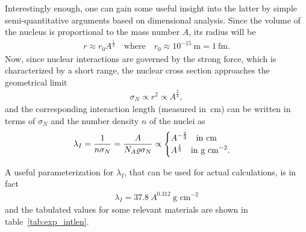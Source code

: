 Interestingly enough, one can gain some useful insight into the latter by simple
semi-quantitative arguments based on dimensional analysis. Since the volume of the
nucleus is proportional to the mass number $A$, its radius will be
\begin{align*}
  r \approx r_0 A^\frac{1}{3}
  \quad\text{where}\quad
  r_0 \approx 10^{-15}~\text{m} = 1~\text{fm}.
\end{align*}
Now, since nuclear interactions are governed by the strong force, which is
characterized by a short range, the nuclear cross section approaches the geometrical
limit
\begin{align*}
  \sigma_N \propto r^2 \propto A^\frac{2}{3},
\end{align*}
and the corresponding interaction length (measured in~cm) can be written in terms
of $\sigma_N$ and the number density $n$ of the nuclei as
\begin{align*}
  \lambda_I = \frac{1}{n \sigma_N} = \frac{A}{N_A \varrho \sigma_N}\propto
  \begin{cases}
    \displaystyle A^{-\frac{2}{3}} \quad\text{in~cm}\\
    \displaystyle A^\frac{1}{3} \quad\text{in~g~cm}^{-2}.
  \end{cases}
\end{align*}

A useful parameterization for $\lambda_I$, that can be used for actual calculations,
is in fact
\begin{align}\label{eq:param_intlen}
  \lambda_I = 37.8~A^{0.312}~\text{g~cm}^{-2}
\end{align}
and the tabulated values for some relevant materials are shown in
table~\ref{tab:exp_intlen}.



